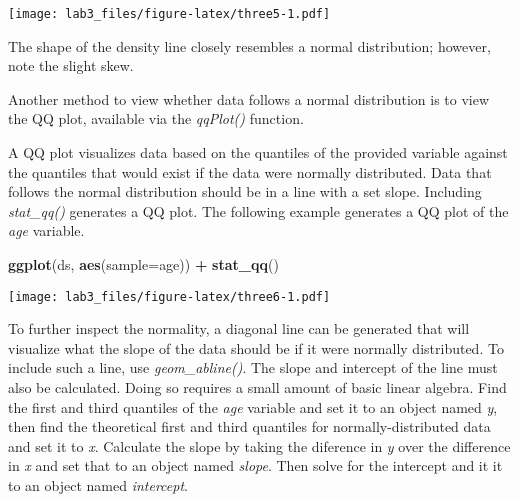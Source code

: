 \documentclass[]{article}
\newenvironment{Shaded}{\begin{snugshade}}{\end{snugshade}}
\newcommand{\KeywordTok}[1]{\textcolor[rgb]{0.13,0.29,0.53}{\textbf{#1}}}
\newcommand{\DataTypeTok}[1]{\textcolor[rgb]{0.13,0.29,0.53}{#1}}
\newcommand{\StringTok}[1]{\textcolor[rgb]{0.31,0.60,0.02}{#1}}
\newcommand{\OperatorTok}[1]{\textcolor[rgb]{0.81,0.36,0.00}{\textbf{#1}}}
\newcommand{\NormalTok}[1]{#1}
\begin{document}
\texttt{[image: lab3\_files/figure-latex/three5-1.pdf]}

The shape of the density line closely resembles a normal distribution;
however, note the slight skew.

Another method to view whether data follows a normal distribution is to
view the QQ plot, available via the \emph{qqPlot()} function.

A QQ plot visualizes data based on the quantiles of the provided
variable against the quantiles that would exist if the data were
normally distributed. Data that follows the normal distribution should
be in a line with a set slope. Including \emph{stat\_qq()} generates a
QQ plot. The following example generates a QQ plot of the \emph{age}
variable.

\begin{Shaded}
\begin{Highlighting}[]
\KeywordTok{ggplot}\NormalTok{(ds, }\KeywordTok{aes}\NormalTok{(}\DataTypeTok{sample=}\NormalTok{age)) }\OperatorTok{+}
\StringTok{  }\KeywordTok{stat_qq}\NormalTok{()}
\end{Highlighting}
\end{Shaded}

\texttt{[image: lab3\_files/figure-latex/three6-1.pdf]}

To further inspect the normality, a diagonal line can be generated that
will visualize what the slope of the data should be if it were normally
distributed. To include such a line, use \emph{geom\_abline()}. The
slope and intercept of the line must also be calculated. Doing so
requires a small amount of basic linear algebra. Find the first and
third quantiles of the \emph{age} variable and set it to an object named
\emph{y}, then find the theoretical first and third quantiles for
normally-distributed data and set it to \emph{x}. Calculate the slope by
taking the diference in \emph{y} over the difference in \emph{x} and set
that to an object named \emph{slope}. Then solve for the intercept and
it it to an object named \emph{intercept}.
\end{document}
